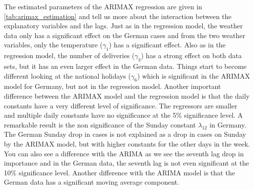 The estimated parameters of the ARIMAX regression are given in \autoref{tab:arimax_estimation} and tell us more about the interaction between the explanatory variables and the lags. Just as in the regression model, the weather data only has a significant effect on the German cases and from the two weather variables, only the temperature ($\gamma_1$) has a significant effect. Also as in the regression model, the number of deliveries ($\gamma_3$) has a strong effect on both data sets, but it has an even larger effect in the German data. Things start to become different looking at the national holidays ($\gamma_6$) which is significant in the ARIMAX model for Germany, but not in the regression model. Another important difference between the ARIMAX model and the regression model is that the daily constants have a very different level of significance. The regressors are smaller and multiple daily constants have no significance at the 5\% significance level. A remarkable result is the non significance of the Sunday constant $\lambda_{12}$ in Germany. The German Sunday drop in cases is not explained as a drop in cases on Sunday by the ARIMAX model, but with higher constants for the other days in the week. You can also see a difference with the ARIMA as we see the seventh lag drop in importance and in the German data, the seventh lag is not even significant at the 10\% significance level. Another difference with the ARIMA model is that the German data has a significant moving average component.\\

